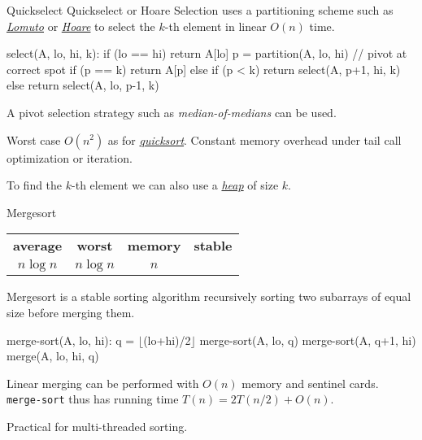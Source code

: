 \documentclass{cognito}
\begin{document}
\begin{note}{Quickselect}
	Quickselect or Hoare Selection uses a partitioning scheme such as \hyperref[note:Lomuto Partitioning]{\it Lomuto} or \hyperref[note:Hoare Partitioning]{\it Hoare}
	to select the $k$-th element in linear $O(n)$ time.
	\begin{largecode}
select(A, lo, hi, k):
	if (lo == hi) return A[lo]
	p = partition(A, lo, hi)  // pivot at correct spot
	if (p == k) return A[p]
	else if (p < k) return select(A, p+1, hi, k)
	else return select(A, lo, p-1, k)
	\end{largecode}
	A pivot selection strategy such as \emph{median-of-medians} can be used.
	\begin{remark} Worst case $O(n^2)$ as for \hyperref[note:Quicksort]{\it quicksort}.
		Constant memory overhead under tail call optimization or iteration.
	\end{remark}
	\begin{remark} To find the $k$-th element we can also use a \hyperref[note:Heap]{\it heap} of size $k$. \end{remark}
	\vspace{-5pt}
\end{note}


\begin{note}{Mergesort}
	\begin{mdframed}[linecolor=black!25!white]%
	\begin{tabular}{@{} c | c | c | c  @{}}
		\bf average & \bf worst & \bf memory & \bf stable \\
		$n \log n$ & $n \log n$ & $n$ & \checkmark
	\end{tabular}%
	\end{mdframed}
	Mergesort is a stable sorting algorithm recursively sorting two subarrays
	of equal size before merging them.
	\begin{largecode}
merge-sort(A, lo, hi):
	q = $\lfloor$(lo+hi)/2$\rfloor$
	merge-sort(A, lo, q)
	merge-sort(A, q+1, hi)
	merge(A, lo, hi, q)
	\end{largecode}
	Linear merging can be performed with $O(n)$ memory and sentinel cards.
	{\tt merge-sort} thus has running time $T(n) = 2T(n/2) + O(n)$.

	\begin{remark} Practical for multi-threaded sorting.\end{remark}\vspace{-5pt}
\end{note}
\end{document}
